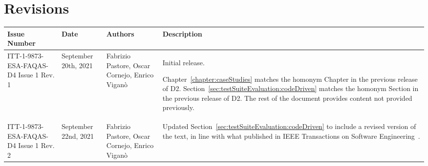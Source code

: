 
\section*{Revisions}
\label{sec:revisions}


\setlength\LTleft{0pt}
\setlength\LTright{0pt}
\tiny 
\begin{longtable}{|p{2cm}|p{1cm}|p{1.5cm}|p{9cm}|@{}}
\label{table:codeoperators} \\
\hline
\textbf{Issue Number}&\textbf{Date}&\textbf{Authors}&\textbf{Description}\\
\hline
ITT-1-9873-ESA-FAQAS-D4
Issue 1 Rev. 1&
September 20th, 2021&
Fabrizio Pastore, Oscar Cornejo, Enrico Viganò&
\begin{minipage}{8cm}
Initial release.

Chapter~\ref{chapter:caseStudies} matches the homonym Chapter in the previous release of D2.
Section~\ref{sec:testSuiteEvaluation:codeDriven} matches the homonym Section in the previous release of D2.
The rest of the document provides content not provided previously.
\end{minipage}
\\
\hline
ITT-1-9873-ESA-FAQAS-D4
Issue 1 Rev. 2&
September 22nd, 2021&
Fabrizio Pastore, Oscar Cornejo, Enrico Viganò&
\begin{minipage}{8cm}
Updated Section~\ref{sec:testSuiteEvaluation:codeDriven} to include a revised version of the text, in line with what published in IEEE Transactions on Software Engineering~\cite{Oscar:TSE}.
\end{minipage}
\\



\hline
                                                    
\end{longtable}
\normalsize

\clearpage